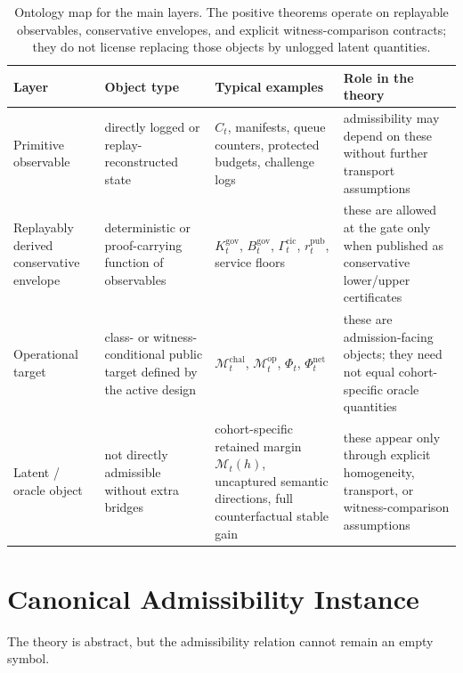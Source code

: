 \documentclass[11pt]{article}
\theoremstyle{definition}
\newcommand{\1}{\mathbf{1}}
\begin{document}
\begin{table}[H]
\centering
\small
\begin{tabularx}{\textwidth}{>{\raggedright\arraybackslash}p{}>{\raggedright\arraybackslash}p{}>{\raggedright\arraybackslash}p{}X}
\toprule
Layer & Object type & Typical examples & Role in the theory \\
\midrule
Primitive observable & directly logged or replay-reconstructed state & $C_t$, manifests, queue counters, protected budgets, challenge logs & admissibility may depend on these without further transport assumptions \\
Replayably derived conservative envelope & deterministic or proof-carrying function of observables & $K_t^{\mathrm{gov}}$, $B_t^{\mathrm{gov}}$, $\Gamma_t^{\mathrm{cic}}$, $r_t^{\mathrm{pub}}$, service floors & these are allowed at the gate only when published as conservative lower/upper certificates \\
Operational target & class- or witness-conditional public target defined by the active design & $\mathcal M_t^{\mathrm{chal}}$, $\mathcal M_t^{\mathrm{op}}$, $\Phi_t$, $\Phi_t^{\mathrm{net}}$ & these are admission-facing objects; they need not equal cohort-specific oracle quantities \\
Latent / oracle object & not directly admissible without extra bridges & cohort-specific retained margin $\mathcal M_t(h)$, uncaptured semantic directions, full counterfactual stable gain & these appear only through explicit homogeneity, transport, or witness-comparison assumptions \\
\bottomrule
\end{tabularx}
\caption{Ontology map for the main layers. The positive theorems operate on replayable observables, conservative envelopes, and explicit witness-comparison contracts; they do not license replacing those objects by unlogged latent quantities.}
\label{tab:ontology_map}
\end{table}

\section{Canonical Admissibility Instance}
The theory is abstract, but the admissibility relation cannot remain an empty symbol.
\end{document}

